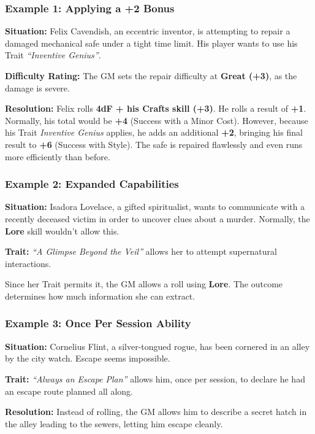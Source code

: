 \subsubsection{Example 1: Applying a +2 Bonus}
\begin{DndReadAloud}{}
\textbf{Situation:} Felix Cavendish, an eccentric inventor, is attempting to repair a damaged mechanical safe under a tight time limit. His player wants to use his Trait \emph{“Inventive Genius”}.

\textbf{Difficulty Rating:} The GM sets the repair difficulty at \textbf{Great (+3)}, as the damage is severe.

    \textbf{Resolution:} Felix rolls \textbf{4dF + his Crafts skill (+3)}. He rolls a result of \textbf{+1}. Normally, his total would be \textbf{+4} (Success with a Minor Cost). However, because his Trait \emph{Inventive Genius} applies, he adds an additional \textbf{+2}, bringing his final result to \textbf{+6} (Success with Style). The safe is repaired flawlessly and even runs more efficiently than before.
\end{DndReadAloud}

\subsubsection{Example 2: Expanded Capabilities}
\begin{DndReadAloud}{}
\textbf{Situation:} Isadora Lovelace, a gifted spiritualist, wants to communicate with a recently deceased victim in order to uncover clues about a murder. Normally, the \textbf{Lore} skill wouldn’t allow this.

\textbf{Trait:} \emph{“A Glimpse Beyond the Veil”} allows her to attempt supernatural interactions.

Since her Trait permits it, the GM allows a roll using \textbf{Lore}. The outcome determines how much information she can extract.
\end{DndReadAloud}

\subsubsection{Example 3: Once Per Session Ability}
\begin{DndReadAloud}{}
\textbf{Situation:} Cornelius Flint, a silver-tongued rogue, has been cornered in an alley by the city watch. Escape seems impossible.

\textbf{Trait:} \emph{“Always an Escape Plan”} allows him, once per session, to declare he had an escape route planned all along.

    \textbf{Resolution:} Instead of rolling, the GM allows him to describe a secret hatch in the alley leading to the sewers, letting him escape cleanly.
\end{DndReadAloud}
 
